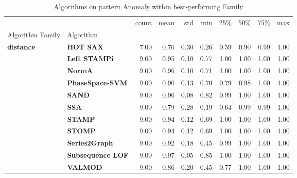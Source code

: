 \begin{table}
\caption{Algorithms on pattern Anomaly within best-performing Family}
\label{tab:bp-pattern}
\begin{tabular}{llrrrrrrrr}
\toprule
 &  & count & mean & std & min & 25\% & 50\% & 75\% & max \\
Algorithm Family & Algorithm &  &  &  &  &  &  &  &  \\
\midrule
\multirow[t]{11}{*}{\textbf{distance}} & \textbf{HOT SAX} & 7.00 & 0.76 & 0.30 & 0.26 & 0.59 & 0.90 & 0.99 & 1.00 \\
\textbf{} & \textbf{Left STAMPi} & 9.00 & 0.95 & 0.10 & 0.77 & 1.00 & 1.00 & 1.00 & 1.00 \\
\textbf{} & \textbf{NormA} & 9.00 & 0.96 & 0.10 & 0.71 & 1.00 & 1.00 & 1.00 & 1.00 \\
\textbf{} & \textbf{PhaseSpace-SVM} & 9.00 & 0.90 & 0.13 & 0.70 & 0.79 & 0.98 & 1.00 & 1.00 \\
\textbf{} & \textbf{SAND} & 9.00 & 0.96 & 0.08 & 0.82 & 0.99 & 1.00 & 1.00 & 1.00 \\
\textbf{} & \textbf{SSA} & 9.00 & 0.79 & 0.28 & 0.19 & 0.64 & 0.99 & 0.99 & 1.00 \\
\textbf{} & \textbf{STAMP} & 9.00 & 0.94 & 0.12 & 0.69 & 1.00 & 1.00 & 1.00 & 1.00 \\
\textbf{} & \textbf{STOMP} & 9.00 & 0.94 & 0.12 & 0.69 & 1.00 & 1.00 & 1.00 & 1.00 \\
\textbf{} & \textbf{Series2Graph} & 9.00 & 0.92 & 0.18 & 0.45 & 0.99 & 1.00 & 1.00 & 1.00 \\
\textbf{} & \textbf{Subsequence LOF} & 9.00 & 0.97 & 0.05 & 0.85 & 1.00 & 1.00 & 1.00 & 1.00 \\
\textbf{} & \textbf{VALMOD} & 9.00 & 0.86 & 0.20 & 0.45 & 0.77 & 1.00 & 1.00 & 1.00 \\
\cline{1-10}
\bottomrule
\end{tabular}
\end{table}

